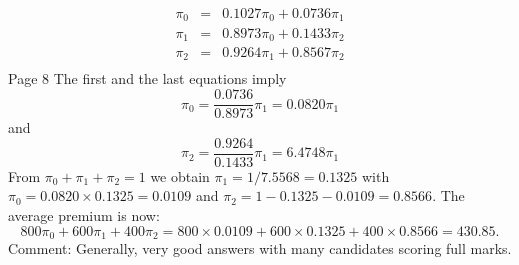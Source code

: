 \documentclass[a4paper,12pt]{article}
\begin{document}
\begin{eqnarray*}
\pi_{0}  &=& 0.1027\pi_{0}  + 0.0736\pi_{1} \\
\pi_{1}  &=& 0.8973\pi_{0}  + 0.1433\pi_{2}\\ 
\pi_{2}  &=& 0.9264\pi_{1}  + 0.8567\pi_{2} \\
\end{eqnarray*}
Page 8%
The first and the last equations imply
\[\pi_{0}  = \frac{0.0736}{0.8973} \pi_{1}  = 0.0820\pi_{1} \]
and
\[\pi_{2}  = \frac{0.9264}{0.1433} \pi_{1}  = 6.4748\pi_{1} \]
From $\pi_{0}  + \pi_{1}  + \pi_{2}  = 1$ we obtain $\pi_{1}  = 1/7.5568 = 0.1325$
with $\pi_{0}  = 0.0820\times 0.1325 = 0.0109$ and $\pi_{2}  = 1 - 0.1325 - 0.0109 = 0.8566$.
The average premium is now:
\[
800 \pi_{0}  + 600 \pi_{1}  + 400 \pi_{2}  = 800 \times  0.0109 + 600 \times  0.1325 + 400 \times  0.8566 =
430.85.\]
Comment: Generally, very good answers with many candidates scoring full marks.
\end{document}
